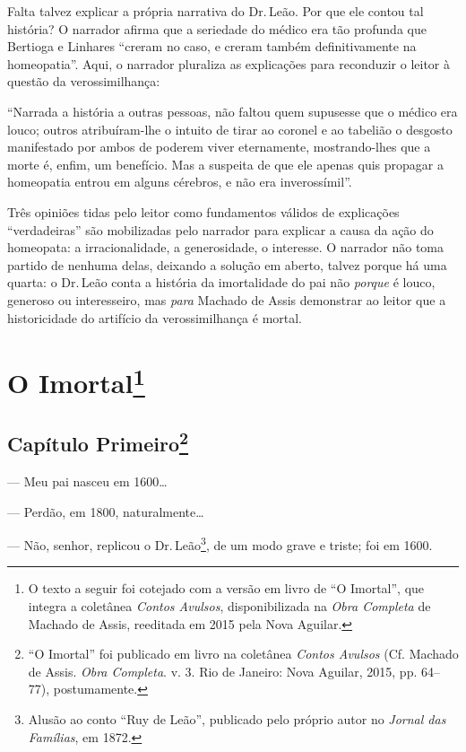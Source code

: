 Falta talvez explicar a própria narrativa do Dr.\,Leão. Por que ele
contou tal história? O narrador afirma que a seriedade do médico era tão
profunda que Bertioga e Linhares ``creram no caso, e creram também
definitivamente na homeopatia''. Aqui, o narrador pluraliza as
explicações para reconduzir o leitor à questão da verossimilhança:

``Narrada a história a outras pessoas, não faltou quem supusesse que o
médico era louco; outros atribuíram-lhe o intuito de tirar ao coronel e
ao tabelião o desgosto manifestado por ambos de poderem viver
eternamente, mostrando-lhes que a morte é, enfim, um benefício. Mas a
suspeita de que ele apenas quis propagar a homeopatia entrou em alguns
cérebros, e não era inverossímil''.

Três opiniões tidas pelo leitor como fundamentos válidos de explicações
``verdadeiras'' são mobilizadas pelo narrador para explicar a causa da
ação do homeopata: a irracionalidade, a generosidade, o interesse. O
narrador não toma partido de nenhuma delas, deixando a solução em
aberto, talvez porque há uma quarta: o Dr.\,Leão conta a história da
imortalidade do pai não \emph{porque} é louco, generoso ou interesseiro,
mas \emph{para} Machado de Assis demonstrar ao leitor que a
historicidade do artifício da verossimilhança é mortal.

\chapter{O Imortal\footnote[*]{O texto a seguir foi cotejado com a versão
  em livro de ``O Imortal'', que integra a coletânea \emph{Contos
  Avulsos}, disponibilizada na \emph{Obra Completa} de Machado de Assis,
  reeditada em 2015 pela Nova Aguilar.}}

\section*{Capítulo Primeiro\protect\footnote{``O
  Imortal'' foi publicado em livro na coletânea \emph{Contos Avulsos}
  (Cf. Machado de Assis. \emph{Obra Completa}. v. 3. Rio de Janeiro:
  Nova Aguilar, 2015, pp. 64--77), postumamente.}}

--- Meu pai nasceu em 1600\ldots{}

--- Perdão, em 1800, naturalmente\ldots{}

--- Não, senhor, replicou o Dr.\,Leão\footnote{Alusão ao conto ``Ruy de
  Leão'', publicado pelo próprio autor no \emph{Jornal das Famílias}, em
  1872.}, de um modo grave e triste; foi em 1600.

